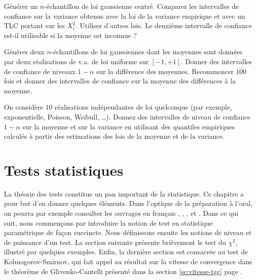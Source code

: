 \begin{exo}
  Générer un $n$-échantillon de loi gaussienne centré. Comparer les
  intervalles de confiance sur la variance obtenus avec la loi de la variance
  empirique et avec un TLC portant sur les $X_i^2$. Utiliser d'autres lois. Le
  deuxième intervalle de confiance est-il utilisable si la moyenne est
  inconnue ?
\end{exo}

\begin{exo}
  Générer deux $n$-échantillons de loi gaussiennes dont les moyennes sont
  données par deux réalisations de v.a. de loi uniforme sur $[-1,+1]$. Donner
  des intervalles de confiance de niveaux $1-\alpha$ sur la différence des
  moyennes. Recommencer $100$ fois et donner des intervalles de confiance sur
  la moyenne des différences à la moyenne.
\end{exo}

\begin{exo}
  On considère $10$ réalisations indépendantes de loi quelconque (par exemple,
  exponentielle, Poisson, Weibull, \ldots). Donnez des intervalles de niveau
  de confiance $1-\alpha$ sur la moyenne et sur la variance en utilisant des
  quantiles empiriques calculés à partir des estimations des lois de la
  moyenne et de la variance.
\end{exo}

%
\section{Tests statistiques}\label{se:tests}
%


La théorie des tests constitue un pan important de la statistique. Ce chapitre
a pour but d'en donner quelques éléments. Dans l'optique de la préparation à
l'oral, on pourra par exemple consulter les ouvrages en français \cite{vokac},
\cite{dacunha-castelle-duflo}, \cite{paul-toulouse}, \cite{saporta} et
\cite{tomassone}. Dans ce qui suit, nous commençons par introduire la notion
de test en statistique paramétrique de façon succincte. Nous définissons
ensuite les notions de niveau et de puissance d'un test. La section suivante
présente brièvement le test du $\chi^2$, illustré par quelques exemples.
Enfin, la dernière section est consacrée au test de Kolmogorov-Smirnov, qui
fait appel au résultat sur la vitesse de convergence dans le théorème de
Glivenko-Cantelli présenté dans la section \ref{se:vitesse-tgc} page
\pageref{se:vitesse-tgc}.

